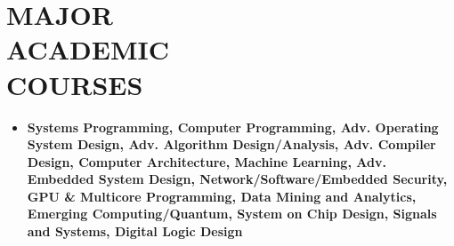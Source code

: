 \documentclass[line,margin,9pt]{res}
\begin{document}
\begin{resume}
\begin{itemize}


\end{itemize}

\section{MAJOR\\ACADEMIC\\COURSES}
\begin{itemize}
\item \bf Systems Programming,
\bf Computer Programming,
\bf Adv. Operating System Design,
\bf Adv. Algorithm Design/Analysis,
\bf Adv. Compiler Design,
\bf Computer Architecture,
\bf Machine Learning,
\bf Adv. Embedded System Design,
\bf Network/Software/Embedded Security,
\bf GPU \& Multicore Programming,
\bf Data Mining and Analytics,
\bf Emerging Computing/Quantum,
\bf System on Chip Design,
\bf Signals and Systems,
\bf Digital Logic Design
\end{itemize}


\end{resume}
\end{document}

